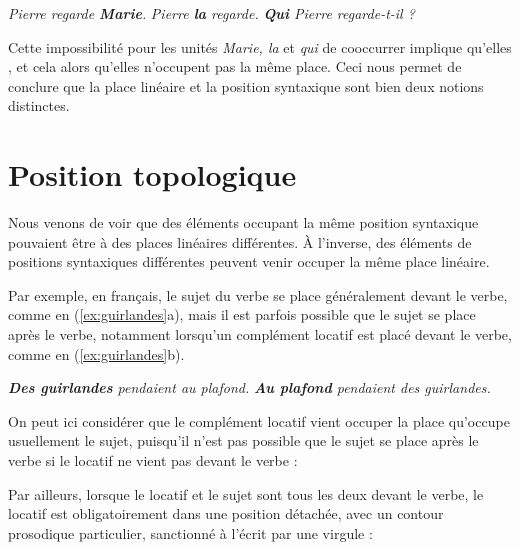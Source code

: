 \ea\label{ex:quila}
  \ea \textit{{Pierre regarde} \textbf{{Marie}}.}
  \ex \textit{{Pierre} \textbf{{la}}  {regarde.}}
  \ex \textit{\textbf{{Qui}}  {Pierre regarde-t-il} ?}
  \z
\z

\ea\label{ex:quilapas}
\z
\z

Cette impossibilité pour les unités \textit{Marie, la} et \textit{qui} de cooccurrer implique qu’elles , et cela alors qu’elles n’occupent pas la même place. Ceci nous permet de conclure que la place linéaire et la position syntaxique sont bien deux notions distinctes.

\section{Position topologique}\label{sec:3.5.4}

Nous venons de voir que des éléments occupant la même position syntaxique pouvaient être à des places linéaires différentes. À l’inverse, des éléments de positions syntaxiques différentes peuvent venir occuper la même place linéaire.

Par exemple, en français, le sujet du verbe se place généralement devant le verbe, comme en (\ref{ex:guirlandes}a), mais il est parfois possible que le sujet se place après le verbe, notamment lorsqu’un complément locatif est placé devant le verbe, comme en (\ref{ex:guirlandes}b).

\ea\label{ex:guirlandes}
    \ea\textit{\textbf{{Des guirlandes}}  {pendaient au plafond}.}
    \ex\textit{\textbf{{Au plafond}}  {pendaient des guirlandes}.}
\z
\z

On peut ici considérer que le complément locatif vient occuper la place qu’occupe usuellement le sujet, puisqu’il n’est pas possible que le sujet se place après le verbe si le locatif ne vient pas devant le verbe :

\ea
{}
\z
\z

Par ailleurs, lorsque le locatif et le sujet sont tous les deux devant le verbe, le locatif est obligatoirement dans une position détachée, avec un contour prosodique particulier, sanctionné à l’écrit par une virgule :

